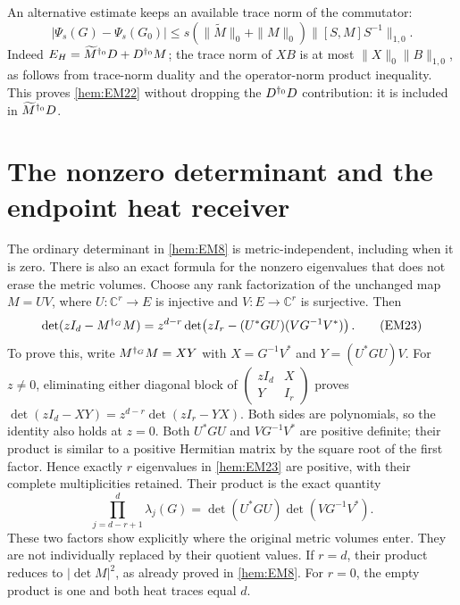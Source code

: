 \documentclass[11pt]{article}
\begin{document}
An alternative estimate keeps an available trace norm of the
commutator:
\begin{equation}
 |\Psi_s(G)-\Psi_s(G_0)|
 \le s(\|\widetilde M\|_0+\|M\|_0)\|[S,M]S^{-1}\|_{1,0}.
 \tag{EM22}\label{hem:EM22}
\end{equation}
Indeed \(E_H=\widetilde M^{\dagger_0}D+D^{\dagger_0}M\); the trace norm
of \(XB\) is at most \(\|X\|_0\|B\|_{1,0}\), as follows from trace-norm
duality and the operator-norm product inequality. This proves
\eqref{hem:EM22} without dropping the \(D^{\dagger_0}D\) contribution:
it is included in \(\widetilde M^{\dagger_0}D\).

\section{The nonzero determinant and the endpoint heat receiver}

The ordinary determinant in \eqref{hem:EM8} is metric-independent, including
when it is zero. There is also an exact formula for the nonzero
eigenvalues that does not erase the metric volumes. Choose any rank
factorization of the unchanged map
\(M=UV\), where \(U:\mathbb C^r\to E\) is injective and
\(V:E\to\mathbb C^r\) is surjective. Then
\begin{equation}
 \det(zI_d-M^{\dagger_G}M)
 =z^{d-r}\det\!\left(zI_r-(U^*GU)(VG^{-1}V^*)\right).
 \tag{EM23}\label{hem:EM23}
\end{equation}
To prove this, write \(M^{\dagger_G}M=XY\) with
\(X=G^{-1}V^*\) and \(Y=(U^*GU)V\).
For \(z\ne0\), eliminating either diagonal block of
\(\left(\begin{smallmatrix}zI_d&X\\Y&I_r\end{smallmatrix}\right)\)
proves
\(\det(zI_d-XY)=z^{d-r}\det(zI_r-YX)\).
Both sides are polynomials, so the identity also holds at \(z=0\).
Both \(U^*GU\) and \(VG^{-1}V^*\) are positive definite; their product
is similar to a positive Hermitian matrix by the square root of the
first factor. Hence exactly \(r\) eigenvalues in \eqref{hem:EM23} are
positive, with their complete multiplicities retained.
Their product is the exact quantity
\begin{equation}
 \prod_{j=d-r+1}^{d}\lambda_j(G)
     =\det(U^*GU)\det(VG^{-1}V^*).
 \tag{EM24}\label{hem:EM24}
\end{equation}
These two factors show explicitly where the original metric volumes
enter. They are not individually replaced by their quotient values.
If \(r=d\), their product reduces to \(|\det M|^2\), as already
proved in \eqref{hem:EM8}. For \(r=0\), the empty product is one and both
heat traces equal \(d\).
\end{document}
